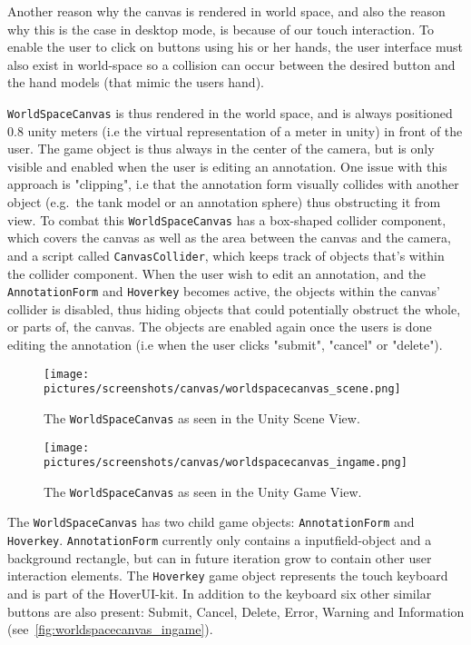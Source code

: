 Another reason why the canvas is rendered in world space, and also the reason why this is the case in desktop mode, is because of our touch interaction.
To enable the user to click on buttons using his or her hands, the user interface must also exist in world-space so a collision can occur between the desired 
button and the hand models (that mimic the users hand). 

\texttt{WorldSpaceCanvas} is thus rendered in the world space, and is always positioned 0.8 unity meters (i.e the virtual representation of a meter in unity) 
in front of the user. The game object is thus always in the center of the camera, but is only visible and enabled when the user is editing an annotation. 
One issue with this approach is "clipping", i.e that the annotation form visually collides with another object (e.g.~the tank model or an annotation sphere) thus
obstructing it from view. To combat this \texttt{WorldSpaceCanvas} has a box-shaped collider component, which covers the canvas as well as the area between the canvas and the camera, 
and a script called \texttt{CanvasCollider}, which keeps track of objects that's within the collider component. When the user wish to edit an annotation, and the 
\texttt{AnnotationForm} and \texttt{Hoverkey} becomes active, the objects within the canvas' collider is disabled, thus hiding objects that could potentially
obstruct the whole, or parts of, the canvas. The objects are enabled again once the users is done editing the annotation (i.e when the user clicks "submit", "cancel" or "delete").

\begin{figure}%
	\texttt{[image: pictures/screenshots/canvas/worldspacecanvas\_scene.png]}
	\caption[The \texttt{WorldSpaceCanvas} as seen in the Unity Scene View]{The \texttt{WorldSpaceCanvas} as seen in the Unity Scene View.}
	\label{fig:worldspacecanvas_scene}
\end{figure} 

\begin{figure}%
	\texttt{[image: pictures/screenshots/canvas/worldspacecanvas\_ingame.png]}
	\caption[The \texttt{WorldSpaceCanvas} as seen in the Unity Game View]{The \texttt{WorldSpaceCanvas} as seen in the Unity Game View.}
	\label{fig:worldspacecanvas_ingame}
\end{figure} 

The \texttt{WorldSpaceCanvas} has two child game objects: \texttt{AnnotationForm} and \texttt{Hoverkey}. 
\texttt{AnnotationForm} currently only contains a inputfield-object and a background rectangle, but can in future iteration grow to 
contain other user interaction elements. The \texttt{Hoverkey} game object represents the touch keyboard and is part of the HoverUI-kit.
In addition to the keyboard six other similar buttons are also present: Submit, Cancel, Delete, Error, Warning and Information (see~\vref{fig:worldspacecanvas_ingame}).

